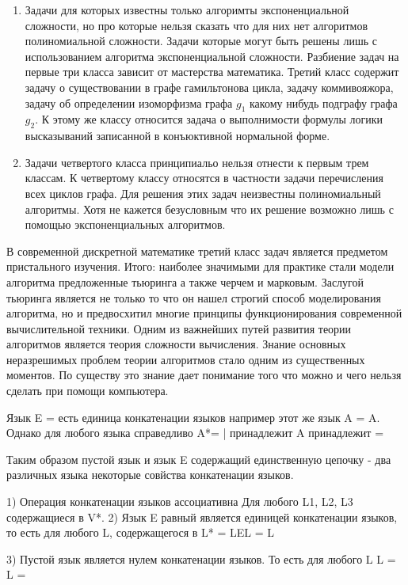 {\begin{enumerate}
\item Задачи для которых известны только алгоримты экспоненциальной сложности, но про которые нельзя сказать что для них нет алгоритмов полиномиальной сложности. Задачи которые могут быть решены лишь с использованием алгоритма экспоненциальной сложности. Разбиение задач на первые три класса зависит от мастерства математика.
Третий класс содержит задачу о существовании в графе гамильтонова цикла, задачу коммивояжора, задачу об определении изоморфизма графа $g_1$ какому нибудь подграфу графа $g_2$.
К этому же классу относится задача о выполнимости формулы логики высказываний записанной в конъюктивной нормальной форме.

\item Задачи четвертого класса принципиальо нельзя отнести к первым трем классам. К четвертому классу относятся в частности задачи перечисления всех циклов графа.
Для решения этих задач неизвестны полиномиальный алгоритмы. Хотя не кажется безусловным что их решение возможно лишь с помощью экспоненциальных алгоритмов.

\end{enumerate}


В современной дискретной математике третий класс задач является предметом пристального изучения. Итого: наиболее значимыми для практике стали модели алгоритма предложенные тьюринга а также черчем и марковым. Заслугой тьюринга является не только то что он нашел строгий способ моделирования алгоритма, но и предвосхитил многие принципы функционирования современной вычислительной техники. Одним из важнейших путей развития теории алгоритмов является теория сложности вычисления. Знание основных неразрешимых проблем теории алгоритмов стало одним из существенных моментов. По существу это знание дает понимание того что можно и чего нельзя сделать при помощи компьютера.

Язык E = {\eps} есть единица конкатенации языков например этот же язык A = A. Однако для любого языка справедливо A*\empty = {\omega*\phi | \omega принадлежит A \phi принадлежит \empty} = \empty

Таким образом пустой язык и язык E содержащий единственную цепочку \eps - два различных языка некоторые совйства конкатенации языков.

1) Операция конкатенации языков ассоциативна
Для любого L1, L2, L3 содержащиеся в V*. 
2) Язык E равный {\eps} является единицей конкатенации языков, то есть для любого L, содержащегося в L* = LEL = L

3) Пустой язык является нулем конкатенации языков. То есть для любого L 
\empty L = L \empty = \empty

}
